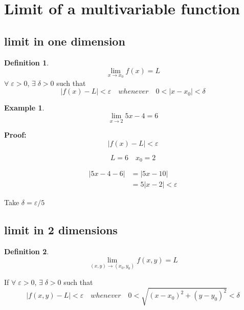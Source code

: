 \documentclass[12pt]{article}
\theoremstyle{definition}
\newtheorem*{example}{Example}
\theoremstyle{definition}
\newtheorem*{defn}{Definition}
\begin{document}
\section{Limit of a multivariable function}

\subsection{limit in one dimension}
\begin{defn}
	\begin{equation*}
		\lim_{x \to x_0} f(x) = L 
	\end{equation*}
	$\forall\;\varepsilon > 0$, $\exists\;\delta > 0$ such that
	\begin{equation*}
		\left| f(x) - L  \right| < \varepsilon \quad whenever \quad 0 < \left| x - x_0 \right| < \delta
	\end{equation*}
\end{defn}

\begin{example}
	\begin{equation*}
		\lim_{x \to 2} 5x-4 = 6
	\end{equation*}

	\textbf{Proof:} 
	\begin{equation*}
		\left| f(x) - L \right| < \varepsilon
	\end{equation*}

	\begin{equation*}
		L = 6 \quad x_0 = 2
	\end{equation*}

	\begin{align*}
		\left| 5x - 4 - 6 \right| &= \left| 5x -10 \right| \\
		&= 5 \left| x -2 \right| < \varepsilon
	\end{align*}

	Take $\delta = \varepsilon/5$

\end{example}

\subsection{limit in 2 dimensions}

\begin{defn}
	\begin{equation*}
		\lim_{(x, y) \to (x_0, y_0)} f(x, y) = L
	\end{equation*}

	If $\forall\;\varepsilon > 0$, $\exists\;\delta > 0$ such that
	\begin{equation*}
		\left| f(x, y) - L \right| < \varepsilon \quad whenever \quad 0 < \sqrt{(x - x_0)^2 + (y - y_0)^2} < \delta
	\end{equation*}
\end{defn}
\end{document}
